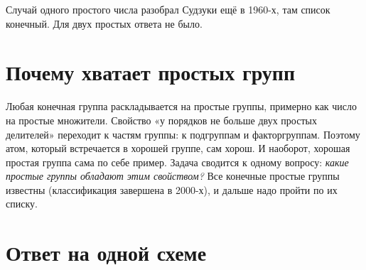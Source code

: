 \documentclass[11pt,a4paper]{article}
\begin{document}
Случай одного простого числа разобрал Судзуки ещё в 1960-х, там список конечный. Для двух простых ответа не было.

\section{Почему хватает простых групп}

Любая конечная группа раскладывается на простые группы, примерно как число на простые множители. Свойство «у порядков не больше двух простых делителей» переходит к частям группы: к подгруппам и факторгруппам. Поэтому атом, который встречается в хорошей группе, сам хорош. И наоборот, хорошая простая группа сама по себе пример. Задача сводится к одному вопросу: \emph{какие простые группы обладают этим свойством?} Все конечные простые группы известны (классификация завершена в 2000-х), и дальше надо пройти по их списку.

\section{Ответ на одной схеме}
\end{document}
